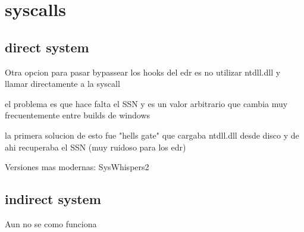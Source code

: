 \chapter{syscalls}

\section{direct system}

Otra opcion para pasar bypassear los hooks del edr es no utilizar ntdll.dll y 
llamar directamente a la syscall

el problema es que hace falta el SSN y es un valor arbitrario que cambia muy 
frecuentemente entre builds de windows

la primera solucion de esto fue "hells gate" que cargaba ntdll.dll desde disco
y de ahi recuperaba el SSN (muy ruidoso para los edr)

Versiones mas modernas: SysWhispers2

\section{indirect system}

Aun no se como funciona